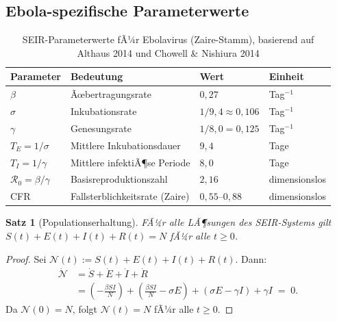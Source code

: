 ﻿\documentclass[12pt,a4paper]{article}
\theoremstyle{definition}
\theoremstyle{plain}
\newtheorem{satz}[definition]{Satz}
\theoremstyle{remark}
\begin{document}
\subsection{Ebola-spezifische Parameterwerte}

\begin{table}[H]
\centering
\caption{SEIR-Parameterwerte fÃ¼r Ebolavirus (Zaire-Stamm), basierend auf
Althaus 2014 \cite{althaus2014} und Chowell \& Nishiura 2014 \cite{chowell2014}}
\label{tab:params}
\begin{tabularx}{\textwidth}{lXll}
\toprule
Parameter & Bedeutung & Wert & Einheit \\
\midrule
$\beta$ & Ãœbertragungsrate & $0{,}27$ & Tag$^{-1}$ \\
$\sigma$ & Inkubationsrate & $1/9{,}4 \approx 0{,}106$ & Tag$^{-1}$ \\
$\gamma$ & Genesungsrate & $1/8{,}0 = 0{,}125$ & Tag$^{-1}$ \\
$T_E = 1/\sigma$ & Mittlere Inkubationsdauer & $9{,}4$ & Tage \\
$T_I = 1/\gamma$ & Mittlere infektiÃ¶se Periode & $8{,}0$ & Tage \\
$\mathcal{R}_0 = \beta/\gamma$ & Basisreproduktionszahl & $2{,}16$ & dimensionslos \\
CFR & Fallsterblichkeitsrate (Zaire) & $0{,}55$--$0{,}88$ & dimensionslos \\
\bottomrule
\end{tabularx}
\end{table}

\begin{satz}[Populationserhaltung]
FÃ¼r alle LÃ¶sungen des SEIR-Systems gilt $S(t) + E(t) + I(t) + R(t) = N$ fÃ¼r alle $t \geq 0$.
\end{satz}

\begin{proof}
Sei $\mathcal{N}(t) := S(t) + E(t) + I(t) + R(t)$. Dann:
\begin{align*}
  \dot{\mathcal{N}} &= \dot{S} + \dot{E} + \dot{I} + \dot{R} \\
  &= \left(-\tfrac{\beta SI}{N}\right)
     + \left(\tfrac{\beta SI}{N} - \sigma E\right)
     + \left(\sigma E - \gamma I\right)
     + \gamma I \;=\; 0.
\end{align*}
Da $\mathcal{N}(0) = N$, folgt $\mathcal{N}(t) = N$ fÃ¼r alle $t \geq 0$.
\end{proof}
\end{document}
